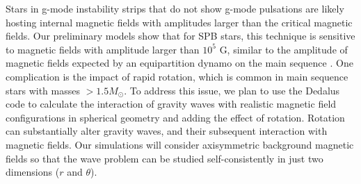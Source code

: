 Stars in g-mode instability strips that do not show g-mode pulsations are likely hosting internal magnetic fields with amplitudes larger than the critical
magnetic fields. Our preliminary models show that for SPB stars, this technique is sensitive to magnetic fields with amplitude larger than $10^5$ G,
similar to the amplitude of magnetic fields expected by an equipartition dynamo on the main sequence \citep[See e.g.][]{Featherstone_2009,Augustson_2016}.
One complication is the impact of rapid rotation, which is common in main sequence stars with masses $> 1.5M_\odot$. To address this issue,
we plan to use the Dedalus code to calculate the interaction of gravity waves with realistic magnetic field configurations in spherical geometry \citep[e.g.][]{Braithwaite_2006} 
and adding the effect of rotation. Rotation can substantially alter gravity waves, and their subsequent interaction with magnetic fields. Our simulations will consider axisymmetric background magnetic fields so that the wave problem can be studied self-consistently in just two dimensions ($r$ and $\theta$). 